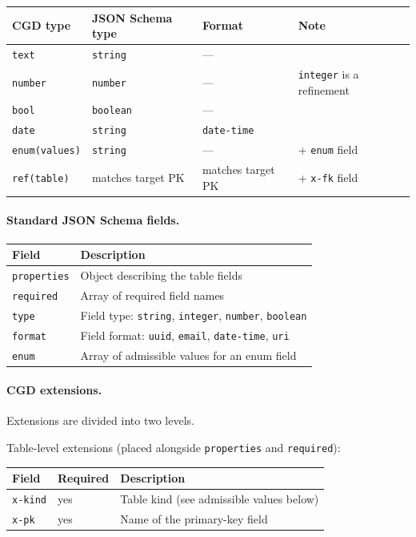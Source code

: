 \begin{tabular}{llll}
\hline
\textbf{CGD type} & \textbf{JSON Schema type} & \textbf{Format} & \textbf{Note} \\
\hline
\texttt{text} & \texttt{string} & --- & \\
\texttt{number} & \texttt{number} & --- & \texttt{integer} is a refinement \\
\texttt{bool} & \texttt{boolean} & --- & \\
\texttt{date} & \texttt{string} & \texttt{date-time} & \\
\texttt{enum(values)} & \texttt{string} & --- & + \texttt{enum} field \\
\texttt{ref(table)} & matches target PK & matches target PK & + \texttt{x-fk} field \\
\hline
\end{tabular}

\paragraph{Standard JSON Schema fields.}

\begin{tabular}{ll}
\hline
\textbf{Field} & \textbf{Description} \\
\hline
\texttt{properties} & Object describing the table fields \\
\texttt{required} & Array of required field names \\
\texttt{type} & Field type: \texttt{string}, \texttt{integer}, \texttt{number}, \texttt{boolean} \\
\texttt{format} & Field format: \texttt{uuid}, \texttt{email}, \texttt{date-time}, \texttt{uri} \\
\texttt{enum} & Array of admissible values for an enum field \\
\hline
\end{tabular}

\paragraph{CGD extensions.}

Extensions are divided into two levels.

Table-level extensions (placed alongside \texttt{properties} and \texttt{required}):

\begin{tabular}{lll}
\hline
\textbf{Field} & \textbf{Required} & \textbf{Description} \\
\hline
\texttt{x-kind} & yes & Table kind (see admissible values below) \\
\texttt{x-pk} & yes & Name of the primary-key field \\
\hline
\end{tabular}

